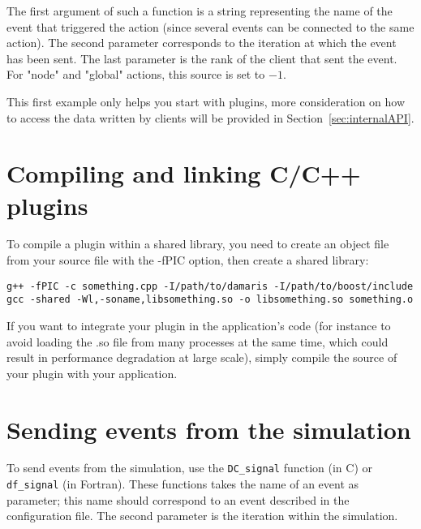 \documentclass[11pt]{report}
\newcommand{\function}[1]{\texttt{#1}}
\begin{document}
The first argument of such a function is a string representing the name of the event that triggered
the action (since several events can be connected to the same action). The second parameter
corresponds to the iteration at which the event has been sent. The last parameter is the rank
of the client that sent the event. For "node" and "global" actions, this source is set to $-1$.

This first example only helps you start with plugins, more consideration on how to
access the data written by clients will be provided in Section~\ref{sec:internalAPI}.

\section{Compiling and linking C/C++ plugins}

To compile a plugin within a shared library, 
you need to create an object file from your source file with the -fPIC option,
then create a shared library:
\begin{verbatim}
g++ -fPIC -c something.cpp -I/path/to/damaris -I/path/to/boost/include
gcc -shared -Wl,-soname,libsomething.so -o libsomething.so something.o
\end{verbatim}

If you want to integrate your plugin in the application's code (for instance to avoid
loading the .so file from many processes at the same time, which could result in performance
degradation at large scale), simply compile the source of your plugin with your application.


\section{Sending events from the simulation}

To send events from the simulation, use the \function{DC\_signal} function (in C) or \function{df\_signal}
(in Fortran). These functions takes the name of an event as parameter; this name should correspond to
an event described in the configuration file. The second parameter is the iteration within the simulation.
\end{document}
